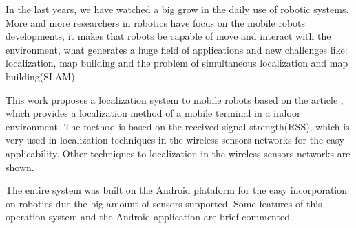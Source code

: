   In the last years, we have watched a big grow in the daily use of robotic systems. 
  More and more researchers in robotics have focus on the mobile robots developments, it makes that 
  robots be capable of move and interact with the environment, what generates a huge field of applications
  and new challenges like: localization, map building and the problem of simultaneous
  localization and map building(SLAM).

  This work proposes a localization system to mobile robots based on the article \cite{wifiRadar}, 
  which provides a localization method of a mobile terminal in a indoor environment. The method is 
  based on the received signal strength(RSS), which is very used in localization techniques 
  in the wireless sensors networks for the easy applicability. Other techniques to localization 
  in the wireless sensors networks are shown.
  
  The entire system was built on the Android plataform for the easy incorporation on robotics 
  due the big amount of sensors supported. 
  Some features of this operation system and the Android application are brief commented. 